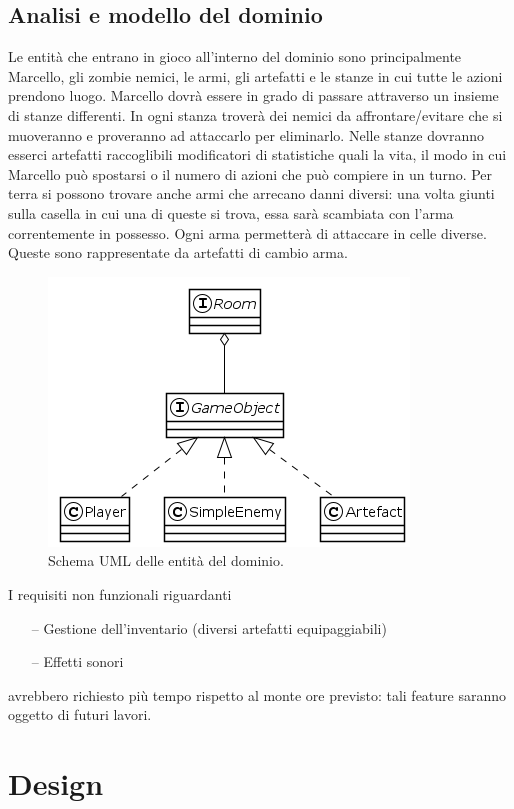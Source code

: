 \documentclass[a4paper,titlepage,12pt]{article}
\begin{document}
\subsection{Analisi e modello del dominio}
Le entità che entrano in gioco all'interno del dominio sono principalmente Marcello, gli zombie nemici, le armi, gli artefatti e le stanze in cui tutte le azioni prendono luogo.
Marcello dovrà essere in grado di passare attraverso un insieme di stanze differenti. In ogni stanza troverà dei nemici da affrontare/evitare che si muoveranno e proveranno ad attaccarlo per eliminarlo. Nelle stanze dovranno esserci artefatti raccoglibili modificatori di statistiche quali la vita, il modo in cui Marcello può spostarsi o il numero di azioni che può compiere in un turno. Per terra si possono trovare anche armi che arrecano danni diversi: una volta giunti sulla casella in cui una di queste si trova, essa sarà scambiata con l'arma correntemente in possesso. Ogni arma permetterà di attaccare in celle diverse. Queste sono rappresentate da artefatti di cambio arma.
\begin{figure}[H]
    \centering
    \includegraphics[scale=0.8]{img/uml/Entity.png}
    \caption{Schema UML delle entità del dominio.}
    \label{img:model}
\end{figure}
\noindent I requisiti non funzionali riguardanti
\begin{itemize}
    \item[--] Gestione dell'inventario (diversi artefatti equipaggiabili)
    \item[--] Effetti sonori
\end{itemize}
avrebbero richiesto più tempo rispetto al monte ore previsto: tali feature saranno oggetto di futuri lavori.

\newpage
\section{Design}
\end{document}
